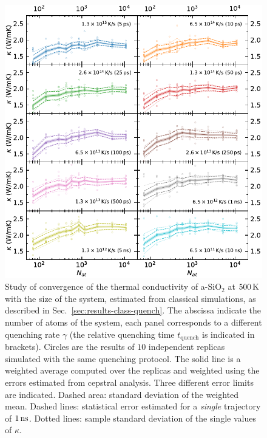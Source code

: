 \begin{figure}[!tb]
    \centering
    \includegraphics[width=\textwidth]{chapters/chapter6/figures/Silica_NVT_kappa_NATconv.pdf}
    \caption{Study of convergence of the thermal conductivity of a-SiO$_2$ at $500\,\mathrm{K}$ with the size of the system, estimated from classical simulations, as described in Sec.~\ref{sec:results-class-quench}. 
    The abscissa indicate the number of atoms of the system, each panel corresponds to a different quenching rate $\gamma$ (the relative quenching time $t_\mathrm{quench}$ is indicated in brackets). 
    Circles are the results of $10$ independent replicas simulated with the same quenching protocol. The solid line is a weighted average computed over the replicas and weighted using the errors estimated from cepstral analysis. Three different error limits are indicated. 
    Dashed area: standard deviation of the weighted mean. 
    Dashed lines: statistical error estimated for a \emph{single} trajectory of $1\,\mathrm{ns}$. 
    Dotted lines: sample standard deviation of the single values of $\kappa$. 
    }
    \label{fig:results-class-kappa-vs-size}
\end{figure}

